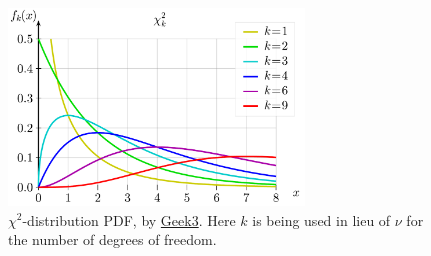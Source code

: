 \begin{figure}
\centering
\includegraphics[width=0.7\textwidth]{figures/stats/dist/chi2_pdf.pdf}
\caption{
$\chi^{2}$-distribution PDF,
by \href{https://en.wikipedia.org/wiki/File:Chi-square_pdf.svg}{Geek3}.
Here $k$ is being used in lieu of $\nu$ for the number of degrees of freedom.
}
\label{fig:dist:chi2}
\end{figure}
